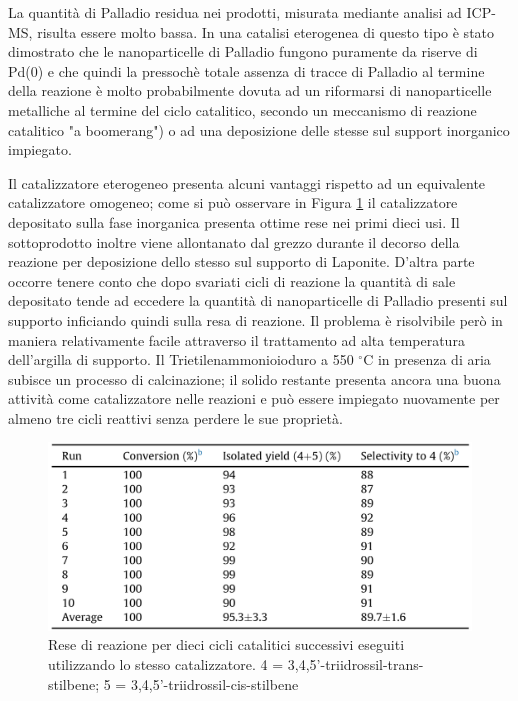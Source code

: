 \documentclass[a4paper, 12pt]{article}
\begin{document}
La quantità di Palladio residua nei prodotti, misurata mediante analisi ad ICP-MS, risulta essere molto bassa. In una catalisi eterogenea di questo tipo è stato dimostrato che le nanoparticelle di Palladio fungono puramente da riserve di Pd(0) e che quindi la pressochè totale assenza di tracce di Palladio al termine della reazione è molto probabilmente dovuta ad un riformarsi di nanoparticelle metalliche al termine del ciclo catalitico, secondo un meccanismo di reazione catalitico "a boomerang") o ad una deposizione delle stesse sul support inorganico impiegato.

Il catalizzatore eterogeneo presenta alcuni vantaggi rispetto ad un equivalente catalizzatore omogeneo; come si può osservare in Figura \ref{fig:perc_cata_resv} il catalizzatore depositato sulla fase inorganica presenta ottime rese nei primi dieci usi. Il sottoprodotto  inoltre viene allontanato dal grezzo durante il decorso della reazione per deposizione dello stesso sul supporto di Laponite. D'altra parte occorre tenere conto che dopo svariati cicli di reazione la quantità di sale depositato tende ad eccedere la quantità di nanoparticelle di Palladio presenti sul supporto inficiando quindi sulla resa di reazione. Il problema è risolvibile però in maniera relativamente facile attraverso il trattamento ad alta temperatura dell'argilla di supporto. Il Trietilenammonioioduro a 550 $^\circ$C in presenza di aria subisce un processo di calcinazione; il solido restante presenta ancora una buona attività come catalizzatore nelle reazioni e può essere impiegato nuovamente per almeno tre cicli reattivi senza perdere le sue proprietà.

\begin{figure}[H]
	\centering
	\includegraphics[width=\linewidth]{immagini/perc_cata_resv.png}
	\caption{Rese di reazione per dieci cicli catalitici successivi eseguiti utilizzando lo stesso catalizzatore. 4 = 3,4,5'-triidrossil-trans-stilbene; 5 = 3,4,5'-triidrossil-cis-stilbene}
	\label{fig:perc_cata_resv}
\end{figure}
\end{document}
